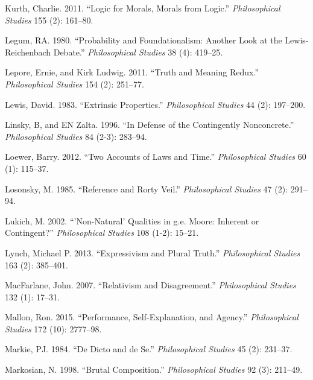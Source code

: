 \documentclass[
  10pt,
  letterpaper,
  DIV=11,
  numbers=noendperiod,
  twoside]{scrartcl}
\newlength{\cslhangindent}
\newenvironment{CSLReferences}[2] %
 {\begin{list}{}{%
  \setlength{\itemindent}{0pt}
  \setlength{\leftmargin}{0pt}
  \setlength{\parsep}{0pt}
  \ifodd #1
   \setlength{\leftmargin}{\cslhangindent}
   \setlength{\itemindent}{-1\cslhangindent}
  \fi
  \setlength{\itemsep}{#2\baselineskip}}}
 {\end{list}}
\begin{document}
\begin{CSLReferences}{1}{0}
Kurth, Charlie. 2011. {``Logic for Morals, Morals from Logic.''}
\emph{Philosophical Studies} 155 (2): 161--80.

Legum, RA. 1980. {``Probability and Foundationalism: Another Look at the
Lewis-Reichenbach Debate.''} \emph{Philosophical Studies} 38 (4):
419--25.

Lepore, Ernie, and Kirk Ludwig. 2011. {``Truth and Meaning Redux.''}
\emph{Philosophical Studies} 154 (2): 251--77.

Lewis, David. 1983. {``Extrinsic Properties.''} \emph{Philosophical
Studies} 44 (2): 197--200.

Linsky, B, and EN Zalta. 1996. {``In Defense of the Contingently
Nonconcrete.''} \emph{Philosophical Studies} 84 (2-3): 283--94.

Loewer, Barry. 2012. {``Two Accounts of Laws and Time.''}
\emph{Philosophical Studies} 60 (1): 115--37.

Losonsky, M. 1985. {``Reference and Rorty Veil.''} \emph{Philosophical
Studies} 47 (2): 291--94.

Lukich, M. 2002. {``'Non-Natural' Qualities in g.e. Moore: Inherent or
Contingent?''} \emph{Philosophical Studies} 108 (1-2): 15--21.

Lynch, Michael P. 2013. {``Expressivism and Plural Truth.''}
\emph{Philosophical Studies} 163 (2): 385--401.

MacFarlane, John. 2007. {``Relativism and Disagreement.''}
\emph{Philosophical Studies} 132 (1): 17--31.

Mallon, Ron. 2015. {``Performance, Self-Explanation, and Agency.''}
\emph{Philosophical Studies} 172 (10): 2777--98.

Markie, PJ. 1984. {``De Dicto and de Se.''} \emph{Philosophical Studies}
45 (2): 231--37.

Markosian, N. 1998. {``Brutal Composition.''} \emph{Philosophical
Studies} 92 (3): 211--49.


\end{CSLReferences}
\end{document}
